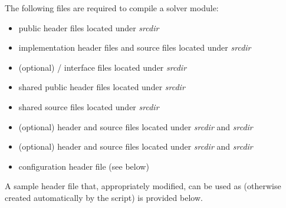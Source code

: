 The following files are required to compile a {\sundials} solver module:
\begin{itemize}
\item public header files located under 
{\em srcdir}
\item implementation header files and source files located under
{\em srcdir}
\item (optional) {\F}/{\C} interface files located under
{\em srcdir}
\item shared public header files located under
{\em srcdir}
\item shared source files located under
{\em srcdir}
\item (optional) {\nvecs} header and source files located under
{\em srcdir} and {\em srcdir} 
\item (optional) {\nvecp} header and source files located under
{\em srcdir} and {\em srcdir} 
\item configuration header file  (see below)
\end{itemize}

A sample header file that, appropriately modified, can be used as
 (otherwise created automatically by the
 script) is provided below.


